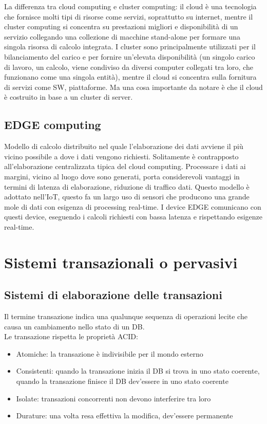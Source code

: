 \documentclass[12pt,italian]{report}
\begin{document}
La differenza tra cloud computing e cluster computing: il cloud è una tecnologia che fornisce molti tipi di risorse come servizi, soprattutto su internet, mentre il cluster computing si concentra su prestazioni migliori e disponibilità di un servizio collegando una collezione di macchine stand-alone per formare una singola risorsa di calcolo integrata. I cluster sono principalmente utilizzati per il bilanciamento del carico e per fornire un'elevata disponibilità (un singolo carico di lavoro, un calcolo, viene condiviso da diversi computer collegati tra loro, che funzionano come una singola entità), mentre il cloud si concentra sulla fornitura di servizi come SW, piattaforme. Ma una cosa importante da notare è che il cloud è costruito in base a un cluster di server. 


\subsection{EDGE computing}
\label{sec: EDGE}
Modello di calcolo distribuito nel quale l'elaborazione dei dati avviene il più vicino possibile a dove i dati vengono richiesti. Solitamente è contrapposto all'elaborazione centralizzata tipica del cloud computing. Processare i dati ai margini, vicino al luogo dove sono generati, porta considerevoli vantaggi in termini di latenza di elaborazione, riduzione di traffico dati. Questo modello è adottato nell'IoT, questo fa un largo uso di sensori che producono una grande mole di dati con esigenza di processing real-time. I device EDGE comunicano con questi device, eseguendo i calcoli richiesti con bassa latenza e rispettando esigenze real-time. 

\section{Sistemi transazionali o pervasivi}


\subsection{Sistemi di elaborazione delle transazioni}
\label{sec:sist trans}
Il termine transazione indica una qualunque sequenza di operazioni lecite che causa un cambiamento nello stato di un DB. \\ Le transazione rispetta le proprietà ACID:
\begin{itemize}
    \item Atomiche: la transazione è indivisibile per il mondo esterno
    \item Consistenti: quando la transazione inizia il DB si trova in uno stato coerente, quando la transazione finisce il DB dev'essere in uno stato coerente
    \item Isolate: transazioni concorrenti non devono interferire tra loro
    \item Durature: una volta resa effettiva la modifica, dev'essere permanente
\end{itemize}
\end{document}
